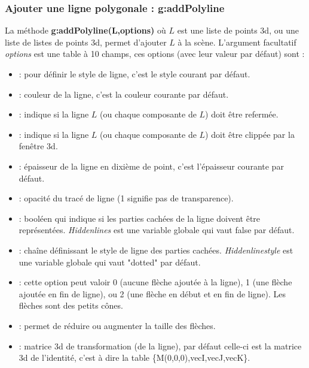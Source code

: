 \subsubsection{Ajouter une ligne polygonale : g:addPolyline}

La méthode \textbf{g:addPolyline(L,options)} où $L$ est une liste de points 3d, ou une liste de listes de points 3d, permet d'ajouter $L$ à la scène. L'argument facultatif \emph{options} est une table à 10 champs, ces options (avec leur valeur par défaut) sont :
    \begin{itemize}
        \item {} : pour définir le style de ligne, c'est le style courant par défaut.
        \item {} : couleur de la ligne, c'est la couleur courante par défaut.
        \item {} : indique si la ligne $L$ (ou chaque composante de $L$) doit être refermée.
        \item {} : indique si la ligne $L$ (ou chaque composante de $L$) doit être clippée par la fenêtre 3d.
        \item {} : épaisseur de la ligne en dixième de point, c'est l'épaisseur courante par défaut.
        \item {} : opacité du tracé de ligne (1 signifie pas de transparence).
        \item {} : booléen qui indique si les parties cachées de la ligne doivent être représentées. \emph{Hiddenlines} est une variable globale qui vaut false par défaut.
        \item {} : chaîne définissant le style de ligne des parties cachées. \emph{Hiddenlinestyle} est une variable globale qui vaut "dotted" par défaut.
        \item {} : cette option peut valoir 0 (aucune flèche ajoutée à la ligne), 1 (une flèche ajoutée en fin de ligne), ou 2 (une flèche en début et en fin de ligne). Les flèches sont des petits cônes.
        \item {} : permet de réduire ou augmenter la taille des flèches.
        \item {} : matrice 3d de transformation (de la ligne), par défaut celle-ci est la matrice 3d de l'identité, c'est à dire la table \{M(0,0,0),vecI,vecJ,vecK\}.
    \end{itemize}
    
